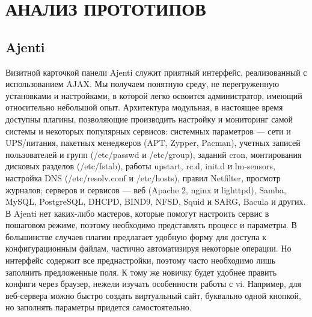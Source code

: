 \section{АНАЛИЗ ПРОТОТИПОВ}
\label{sec:solution}

\subsection{Ajenti}
Визитной карточкой панели Ajenti служит приятный интерфейс, реализованный с использованием AJAX. Мы получаем понятную среду, не перегруженную установками и настройками, в которой легко освоится администратор, имеющий относительно небольшой опыт. Архитектура модульная, в настоящее время доступны плагины, позволяющие производить настройку и мониторинг самой системы и некоторых популярных сервисов:
системных параметров — сети и UPS/питания, пакетных менеджеров (APT, Zypper, Pacman), учетных записей пользователей и групп (/etc/passwd и /etc/group), заданий cron, монтирования дисковых разделов (/etc/fstab), работы upstart, rc.d, init.d и lm-sensors, настройка DNS (/etc/resolv.conf и /etc/hosts), правил Netfilter, просмотр журналов;
серверов и сервисов — веб (Apache 2, nginx и lighttpd), Samba, MySQL, PostgreSQL, DHCPD, BIND9, NFSD, Squid и SARG, Bacula и других.
В Ajenti нет каких-либо мастеров, которые помогут настроить сервис в пошаговом режиме, поэтому необходимо представлять процесс и параметры. В большинстве случаев плагин предлагает удобную форму для доступа к конфигурационным файлам, частично автоматизируя некоторые операции. Но интерфейс содержит все преднастройки, поэтому часто необходимо лишь заполнить предложенные поля. К тому же новичку будет удобнее править конфиги через браузер, нежели изучать особенности работы с vi. Например, для веб-сервера можно быстро создать виртуальный сайт, буквально одной кнопкой, но заполнять параметры придется самостоятельно.

